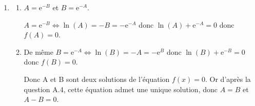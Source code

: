 \documentclass[10pt]{article}
\providecommand{\R}{\mathbb{R}}
\providecommand{\N}{\mathbb{N}}
\providecommand{\e}{{\mathrm{e}}}
\begin{document}
\begin{enumerate}
\begin{enumerate}
\textit{Initialisation :} $a_0=\dfrac{1}{10}$ \quad $a_1=\e^{-1}=\dfrac{1}{\e}$ \quad $b_0=1=\e^0$  \quad $b_1=\e^{-\frac{1}{10}}$.

La fonction $x\mapsto\e^x$ est strictement croissante sur $\R$ et  $-1\leqslant -\dfrac{1}{10} \leqslant 0$ donc ,  $\e^{-1}\leqslant \e^{-\frac{1}{10}} \leqslant \e^0$ et $\dfrac{1}{\e}>\dfrac{1}{10}$ donc  on peut alors affirmer que $0<a_0 \leqslant a_1 \leqslant b_1 \leqslant b_0 \leqslant1$.

L'initialisation est vérifiée.

\textit{Hérédité :} Soit  $n \in \N^*$, et supposons que $0 < a_n \leqslant a_{n+1} \leqslant b_{n+1} \leqslant b_n \leqslant 1$.
		
Montrons que $0 < a_{n+1} \leqslant a_{n+2} \leqslant b_{n+2} \leqslant b_{n+1} \leqslant 1$.
					
La fonction $x \longmapsto \text{e}^{-x}$ est décroissante sur $\R$. Donc 
			
$0 < a_n \leqslant a_{n+1} \leqslant b_{n+1} \leqslant b_n \leqslant 1 \iff \e^{-0} >\e^{-a_n }\geqslant \e^{-a_{n+1}}\geqslant \e^{-b_{n+1}} \geqslant \e^{-b_n} \geqslant \e^{-1} $
			
soit $0< \e^{-1} \leqslant \e^{-b_n} \leqslant \e^{-b_{n+1}} \leqslant \e^{-a_{n+1}} \leqslant \e^{-a_n } < 1 \leqslant 1$ donc

$0 < a_{n+1} \leqslant a_{n+2} \leqslant b_{n+2} \leqslant b_{n+1} \leqslant 1$. On obtient ce qu'il fallait démontrer.
			
L'hérédité est démontrée.
					
\textit{Conclusion : } La proposition est vraie au rang $0$ et si elle est vraie au rang $n$, elle l'est aussi au rang $n + 1$.	D'après l'axiome de récurrence, $\forall n \in \N$, $0 < a_n \leqslant a_{n+1} \leqslant b_{n+1} \leqslant b_n \leqslant 1$.
			\item Nous venons de montrer que $\forall n \in \N$, $0<a_n\leqslant a_{n+1} \leqslant1$ et que $0 \leqslant b_{n+1} \leqslant b_n  \leqslant 1$.
			
			La suite $(a_n)$ est croissante et majorée par 1. D'après  le théorème de convergence monotone, la suite $(a_n)$ converge.
			
			De même, la suite $(b_n)$ est décroissante et minorée par 0. D'après  le théorème de convergence monotone, la suite $(b_n)$ converge.
\end{enumerate}
\item 
	\begin{enumerate}
		\item $A = \text{e}^{-B}$ et $B = \text{e}^{-A}$.

		$A = \text{e}^{-B} \iff \ln(A)=-B=-\e^{-A}$ donc $\ln(A)+\e^{-A}=0$ donc $f(A)=0$.

		\item De même $B = \e^{-A}\iff \ln(B)=-A=-\e^{B}$ donc $\ln(B)+\e^{-B}=0$ donc $f(B)=0$.

Donc A et B sont deux solutions de l'équation $f(x)=0$. Or d'après la question A.4, cette équation admet une unique solution, donc $A= B$ et $A - B = 0$.
	\end{enumerate}
\end{enumerate}
\end{document}
